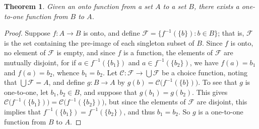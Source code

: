 \documentclass[12pt]{article}
\theoremstyle{plain}
\newtheorem*{thm}{Theorem}
\begin{document}
\begin{thm}
Given an onto function from a set $A$ to a set $B$, there exists a one-to-one function from $B$ to $A$.
\end{thm}
\begin{proof}
Suppose $f:A\rightarrow B$ is onto, and define $\mathcal{F}=\big\{f^{-1}(\{b\}):b\in B\big\}$; that is, $\mathcal{F}$ is the set containing the pre-image of each singleton subset of $B$. Since $f$ is onto, no element of $\mathcal{F}$ is empty, and since $f$ is a function, the elements of $\mathcal{F}$ are mutually disjoint, for if $a\in f^{-1}(\{b_1\})$ and $a\in f^{-1}(\{b_2\})$, we have $f(a)=b_1$ and $f(a)=b_2$, whence $b_1=b_2$. Let $\mathscr{C}:\mathcal{F}\rightarrow\bigcup\mathcal{F}$ be a choice function, noting that $\bigcup\mathcal{F}=A$, and define $g:B\rightarrow A$ by $g(b)=\mathscr{C}\big(f^{-1}(\{b\})\big)$. To see that $g$ is one-to-one, let $b_1,b_2\in B$, and suppose that $g(b_1)=g(b_2)$. This gives 
$\mathscr{C}\big(f^{-1}(\{b_1\})\big)=\mathscr{C}\big(f^{-1}(\{b_2\})\big)$, but since the elements of $\mathcal{F}$ are disjoint, this implies that $f^{-1}(\{b_1\})=f^{-1}(\{b_2\})$, and thus $b_1=b_2$. So $g$ is a one-to-one function from $B$ to $A$. 
\end{proof}
\end{document}
